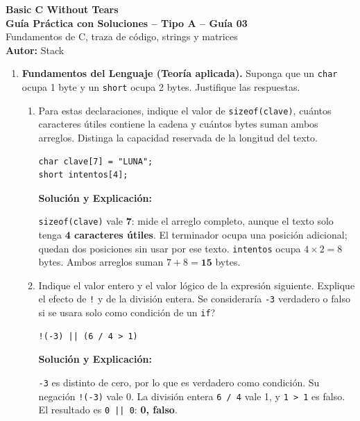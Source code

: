 \documentclass[11pt,letterpaper]{article}
\begin{document}
\begin{center}
    {\LARGE \textbf{Basic C Without Tears}} \\[0.25cm]
    {\Large \textbf{Guía Práctica con Soluciones -- Tipo A -- Guía 03}} \\[0.15cm]
    \small Fundamentos de C, traza de código, strings y matrices \\[0.1cm]
    \textbf{Autor:} Stack
\end{center}
\vspace{0.3cm}

\begin{enumerate}[label=\textbf{\arabic*.}]
    \item \textbf{Fundamentos del Lenguaje (Teoría aplicada).}
    Suponga que un \texttt{char} ocupa 1 byte y un \texttt{short} ocupa 2 bytes. Justifique las respuestas.
    \begin{enumerate}[label=(\alph*)]
        \item Para estas declaraciones, indique el valor de \texttt{sizeof(clave)}, cuántos caracteres útiles contiene la cadena y cuántos bytes suman ambos arreglos. Distinga la capacidad reservada de la longitud del texto.
        \begin{lstlisting}[style=customc,numbers=none]
char clave[7] = "LUNA";
short intentos[4];
        \end{lstlisting}
        \begin{solucionbox}
        \textbf{Solución y Explicación:}\par
        \texttt{sizeof(clave)} vale \textbf{7}: mide el arreglo completo, aunque el texto solo tenga \textbf{4 caracteres útiles}. El terminador ocupa una posición adicional; quedan dos posiciones sin usar por ese texto. \texttt{intentos} ocupa $4\times2=8$ bytes. Ambos arreglos suman $7+8=\textbf{15}$ bytes.
        \end{solucionbox}
        \item Indique el valor entero y el valor lógico de la expresión siguiente. Explique el efecto de \texttt{!} y de la división entera. \textquestiondown{}Se consideraría \texttt{-3} verdadero o falso si se usara solo como condición de un \texttt{if}?
        \begin{lstlisting}[style=customc,numbers=none]
!(-3) || (6 / 4 > 1)
        \end{lstlisting}
        \begin{solucionbox}
        \textbf{Solución y Explicación:}\par
        \texttt{-3} es distinto de cero, por lo que es verdadero como condición. Su negación \texttt{!(-3)} vale 0. La división entera \texttt{6 / 4} vale 1, y \texttt{1 > 1} es falso. El resultado es \texttt{0 || 0}: \textbf{0, falso}.

\end{solucionbox}
\end{enumerate}
\end{enumerate}
\end{document}
